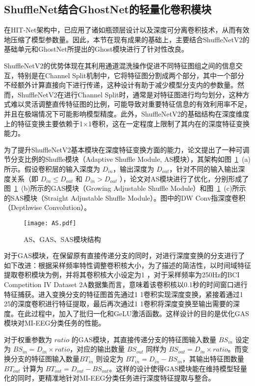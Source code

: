 \subsection{ShuffleNet结合GhostNet的轻量化卷积模块}

在HIT-Net架构中，已应用了诸如瓶颈层设计以及深度可分离卷积技术，从而有效地压缩了模型参数量。因此，本节在现有成果的基础上，主要结合ShuffleNetV2的基础单元和GhostNet所提出的Ghost模块进行了针对性改良。

ShuffleNetV2的优势体现在其利用通道混洗操作促进不同特征图组之间的信息交互，特别是在Channel Split机制中，它将特征图分割成两个部分，其中一个部分不经额外计算直接向下进行传递，这种设计有助于减少模型分支内的参数量。然而，ShuffleNetV2在进行Channel Split时，通常是对特征图进行均匀划分，这种方式难以灵活调整直传特征图的比例，可能导致对重要特征信息的有效利用率不足，并且在极端情况下可能影响模型精度。此外，ShuffleNetV2的基础结构在深度维度上的特征变换主要依赖于1×1卷积，这在一定程度上限制了其内在的深度特征变换能力。

为了提升ShuffleNetV2基本模块在深度特征变换方面的能力，论文提出了一种可调节分支比例的Shuffle模块（Adaptive Shuffle Module, AS模块），其架构如图~\ref{fig:as}~(a)所示。假设卷积层的输入深度为 \(D_{in}\)，输出深度为 \(D_{out}\)，针对不同的输入输出深度关系（即 \(D_{in} \le D_{out}\) 和 \(D_{in} > D_{out}\) ），论文对AS模块进行了优化，分别形成了图~\ref{fig:as}~(b)所示的GAS模块（Growing Adjustable Shuffle Module）和图~\ref{fig:as}~(c)所示的SAS模块（Straight Adjustable Shuffle Module）。图中的DW Conv指深度卷积（Depthwise Convolution）。
\begin{figure}
    \centering
    \texttt{[image: AS.pdf]}
    \caption{AS、GAS、SAS模块结构}
    \label{fig:as}
\end{figure}

对于GAS模块，在保留原有直接传递分支的同时，对进行深度变换的分支进行了如下改进：根据采样频率特性调整卷积核大小，为了描述的简洁性，以时间域特征提取卷积模块为例，并将其卷积核大小设定为1 ，对于采样频率为250Hz的BCI Competition IV Dataset 2A数据集而言，意味着该卷积核以0.1秒的时间窗口进行特征捕获。进入变换分支的特征图首先通过1 \times 1卷积实现深度变换，紧接着通过1 \times 25的深度卷积进行特征提取，最后再次通过1 \times 1卷积将深度变换至输出需要的深度。在此过程中，加入了批归一化和GeLU激活函数。这样设计的目的是优化GAS模块对MI-EEG分类任务的性能。

对于权重参数为 \(ratio\) 的GAS模块，其直接传递分支的特征图输入数量 \(BS_{in}\) 设定为 \(BS_{in} = D_{in} \times ratio\)，对应的输出数量 \(BS_{out}\) 同样为 \(BS_{out} = D_{in} \times ratio\)。而变换分支的特征图输入数量\(BT_{in}\) 则设定为 \(BT_{in} = D_{in} - BS_{in}\)，其输出特征图数量 \(BT_{out}\) 计算为 \(BT_{out} = D_{out} - BS_{out}\)。这样的设计使得GAS模块能在维持模型轻量化的同时，更精准地针对MI-EEG分类任务进行深度特征提取与整合。

